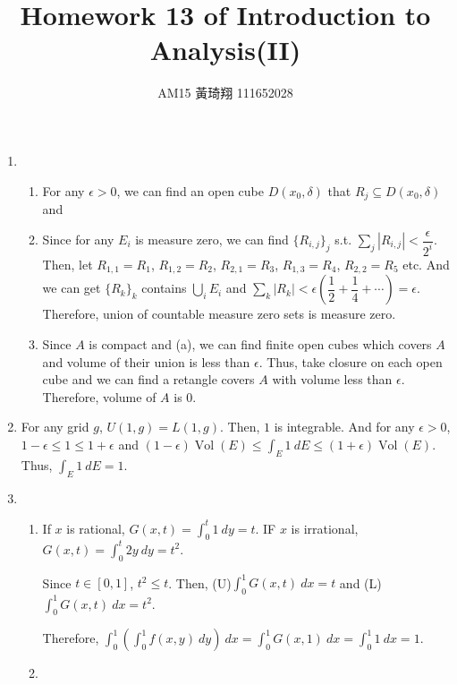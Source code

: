 \documentclass[12pt]{article}
\title{Homework 13 of Introduction to Analysis(II)}
\author{AM15 黃琦翔 111652028}
\DeclareMathOperator{\volume}{Vol}
\begin{document}
\maketitle
\begin{enumerate}
    \item \begin{enumerate}
        \item For any $\epsilon > 0$, 
        we can find an open cube $D(x_0, \delta)$ that $R_j \subseteq D(x_0, \delta)$ and 

        \item Since for any $E_i$ is measure zero, we can find $\{ R_{i, j}\}_j$ s.t. 
        $\displaystyle\sum_{j} |R_{i, j}| < \dfrac{\epsilon}{2^{i}}$.
        Then, let $R_{1, 1} = R_1$, $R_{1,2} = R_2$, $R_{2, 1} = R_3$, $R_{1, 3} = R_4$, $R_{2, 2} = R_5$ etc.
        And we can get $\{ R_k\}_k$ contains $\displaystyle\bigcup_i E_i$ and $\displaystyle\sum_{k} |R_k| < \epsilon(\dfrac{1}{2} + \dfrac{1}{4} + \cdots) = \epsilon$.
        Therefore, union of countable measure zero sets is measure zero.

        \item Since $A$ is compact and (a), we can find finite open cubes which covers $A$ and volume of their union is less than $\epsilon$.
        Thus, take closure on each open cube and we can find a retangle covers $A$ with volume less than $\epsilon$.
        Therefore, volume of $A$ is $0$.
    \end{enumerate}

    \item For any grid $g$, $U(1, g) = L(1, g)$. Then, $1$ is integrable.
    And for any $\epsilon > 0$, $1 - \epsilon \leq 1 \leq 1 + \epsilon$ and $(1-\epsilon)\volume(E) \leq \displaystyle\int_E 1\ dE \leq (1 + \epsilon) \volume(E)$.
    Thus, $\displaystyle\int_E 1\ dE = 1$.

    \item \begin{enumerate}
        \item If $x$ is rational, $G(x, t) = \displaystyle\int_{0}^{t} 1\ dy = t$.
        IF $x$ is irrational, $G(x, t) = \displaystyle\int_{0}^{t} 2y\ dy = t^2$.

        Since $t \in [0, 1]$, $t^2 \leq t$.
        Then, (U)$\displaystyle\int_{0}^{1} G(x, t)\ dx = t$ and (L)$\displaystyle\int_{0}^{1} G(x, t)\ dx = t^2$.

        Therefore, $\displaystyle\int_{0}^{1} (\displaystyle\int_{0}^{1} f(x, y)\ dy)\ dx = \displaystyle\int_{0}^{1} G(x, 1)\ dx = \displaystyle\int_{0}^{1} 1\ dx = 1$.

        \item 
    \end{enumerate}
\end{enumerate}
\end{document}
